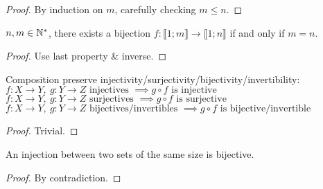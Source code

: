 \begin{proof}
	By induction on $m$, carefully checking $m \leq n$.
\end{proof}
\begin{property}
	$n,m \in \mathbb{N}^*$, there exists a bijection $f:\llbracket 1;m \rrbracket \rightarrow \llbracket 1;n \rrbracket$ if and only if $m=n$.
\end{property}
\begin{proof}
	Use last property \& inverse.
\end{proof}
\begin{property}[Compositions]
	Composition preserve injectivity/surjectivity/bijectivity/invertibility:
	$f: X \to Y, \ g: Y \to Z \text{ injectives } \implies g \circ f \text{ is injective}$\\
	$f: X \to Y, \ g: Y \to Z \text{ surjectives } \implies g \circ f \text{ is surjective}$\\
	$f: X \to Y, \ g: Y \to Z \text{ bijectives/invertibles } \implies g \circ f \text{ is bijective/invertible}$
\end{property}
\begin{proof}
	Trivial.
\end{proof}
\begin{property}
	An injection between two sets of the same size is bijective.
\end{property}
\begin{proof}
	By contradiction.
\end{proof}

